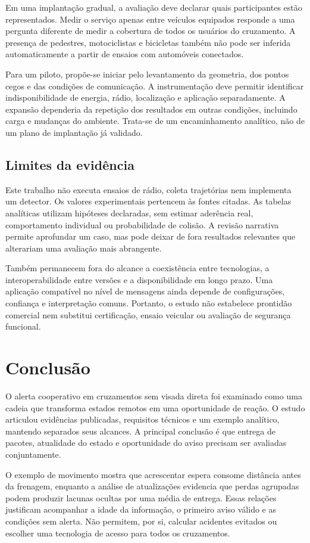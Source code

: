 \documentclass[conference,a4paper]{IEEEtran}
\begin{document}
Em uma implantação gradual, a avaliação deve declarar quais participantes estão representados. Medir o serviço apenas entre veículos equipados responde a uma pergunta diferente de medir a cobertura de todos os usuários do cruzamento. A presença de pedestres, motociclistas e bicicletas também não pode ser inferida automaticamente a partir de ensaios com automóveis conectados.

Para um piloto, propõe-se iniciar pelo levantamento da geometria, dos pontos cegos e das condições de comunicação. A instrumentação deve permitir identificar indisponibilidade de energia, rádio, localização e aplicação separadamente. A expansão dependeria da repetição dos resultados em outras condições, incluindo carga e mudanças do ambiente. Trata-se de um encaminhamento analítico, não de um plano de implantação já validado.

\subsection{Limites da evidência}
Este trabalho não executa ensaios de rádio, coleta trajetórias nem implementa um detector. Os valores experimentais pertencem às fontes citadas. As tabelas analíticas utilizam hipóteses declaradas, sem estimar aderência real, comportamento individual ou probabilidade de colisão. A revisão narrativa permite aprofundar um caso, mas pode deixar de fora resultados relevantes que alterariam uma avaliação mais abrangente.

Também permanecem fora do alcance a coexistência entre tecnologias, a interoperabilidade entre versões e a disponibilidade em longo prazo. Uma aplicação compatível no nível de mensagens ainda depende de configurações, confiança e interpretação comuns. Portanto, o estudo não estabelece prontidão comercial nem substitui certificação, ensaio veicular ou avaliação de segurança funcional.

\section{Conclusão}
O alerta cooperativo em cruzamentos sem visada direta foi examinado como uma cadeia que transforma estados remotos em uma oportunidade de reação. O estudo articulou evidências publicadas, requisitos técnicos e um exemplo analítico, mantendo separados seus alcances. A principal conclusão é que entrega de pacotes, atualidade do estado e oportunidade do aviso precisam ser avaliadas conjuntamente.

O exemplo de movimento mostra que acrescentar espera consome distância antes da frenagem, enquanto a análise de atualizações evidencia que perdas agrupadas podem produzir lacunas ocultas por uma média de entrega. Essas relações justificam acompanhar a idade da informação, o primeiro aviso válido e as condições sem alerta. Não permitem, por si, calcular acidentes evitados ou escolher uma tecnologia de acesso para todos os cruzamentos.
\end{document}
